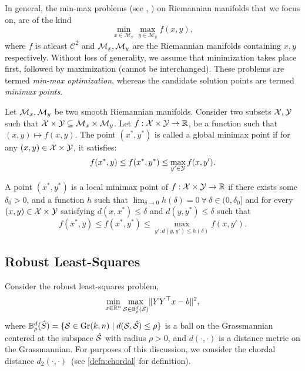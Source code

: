 \begin{definition}
In general, the min-max problems (see \cite{han2023}, \cite{han2024}) on Riemannian manifolds that we focus on, are of the kind
\[
\min_{x \in \mathcal{M}_x} \max_{y \in \mathcal{M}_y} f(x,y),
\]
where $f$ is atleast $\mathcal{C}^2$ and $\mathcal{M}_x,\mathcal{M}_y$ are the Riemannian manifolds containing $x,y$ respectively. Without loss of generality, we assume that minimization takes place first, followed by maximization (cannot be interchanged). These problems are termed \emph{min-max optimization}, whereas the candidate solution points are termed \emph{minimax points}. 

\end{definition}
\begin{definition}
\label{def:global-minimax}
    Let $\mathcal{M}_x, \mathcal{M}_y$ be two smooth Riemannian manifolds. Consider two subsets $\mathcal{X}, \mathcal{Y}$ such that $\mathcal{X} \times \mathcal{Y} \subseteq \mathcal{M}_x \times \mathcal{M}_y$. Let $f: \mathcal{X} \times \mathcal{Y} \to \mathbb{R}$, be a function such that $(x,y) \mapsto f(x,y)$. The point $(x^*, y^*)$ is called a global minimax point if for any $(x,y) \in \mathcal{X} \times \mathcal{Y}$, it satisfies:
    \[
    f(x^*,y) \leq f(x^*, y^*) \leq \max_{y' \in \mathcal{Y}} f(x, y').
    \]
\end{definition}
\begin{definition}
\label{def:local-minimax}
A point $(x^*, y^*)$ is a local minimax point of $f: \mathcal{X} \times \mathcal{Y} \to \mathbb{R}$ if there exists some $\delta_0 > 0$, and a function $h$ such that $\lim_{\delta \to 0} h(\delta) = 0 \ \forall \ \delta \in (0, \delta_0]$ and for every $(x,y) \in \mathcal{X} \times \mathcal{Y}$ satisfying $d(x,x^*) \leq \delta$ and $d(y,y^*) \leq \delta$ such that
\[
f(x^*, y) \leq f(x^*, y^*) \leq \max_{y': d(y,y') \leq h(\delta)} f(x,y').
\]
\end{definition}

\subsection{Robust Least-Squares}
Consider the robust least-squares problem,
\begin{equation}\label{eq:robust-ls}
    \min_{x \in \mathbb{R}^n} \max_{\mathcal{S} \in \mathbb{B}^d_{\rho}(\hat{\mathcal{S}})} \lVert YY^\top x - b \rVert^2,
\end{equation}
where $\mathbb{B}^d_{\rho}(\hat{S}) = \{\mathcal{S} \in \text{Gr}(k,n) \mid d(\mathcal{S}, \hat{\mathcal{S}}) \leq \rho \}$ is a ball on the Grassmannian centered at the subspace $\hat{\mathcal{S}}$ with radius $\rho > 0$, and $d(\cdot, \cdot)$ is a distance metric on the Grassmannian. For purposes of this discussion, we consider the chordal distance $d_2(\cdot, \cdot)$~(see \ref{defn:chordal} for definition).

